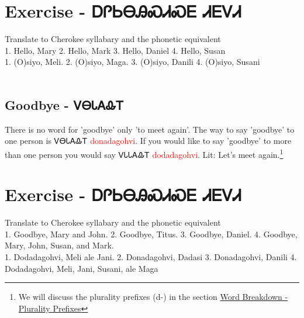 \begin{multicols}
\section{Exercise - ᎠᎵᏏᎾᎯᏍᏗᏍᎬ ᏗᎬᏙᏗ}
Translate to Cherokee syllabary and the phonetic equivalent\\
1. Hello, Mary 2. Hello, Mark 3. Hello, Daniel 4. Hello, Susan\\
1. (O)siyo, Meli. 2. (O)siyo, Maga. 3. (O)siyo, Danili 4. (O)siyo, Susani\\
\
\subsection{Goodbye - ᏙᎾᏓᎪᎲᎢ}
There is no word for 'goodbye' only 'to meet again'. The way to say 'goodbye' to one person is ᏙᎾᏓᎪᎲᎢ \textcolor{red}{donadagohvi}. If you would like to say 'goodbye' to more than one person you would say ᏙᏓᏓᎪᎲᎢ \textcolor{red}{dodadagohvi}.  Lit: Let's meet again.\footnote{We will discuss the plurality prefixes (d-) in the section \hyperref[sec:wordBreakdownPluralityPrefixes]{Word Breakdown - Plurality Prefixes}}
\section{Exercise - ᎠᎵᏏᎾᎯᏍᏗᏍᎬ ᏗᎬᏙᏗ}
Translate to Cherokee syllabary and the phonetic equivalent\\
1. Goodbye, Mary and John. 2. Goodbye, Titus. 3. Goodbye, Daniel. 4. Goodbye, Mary, John, Susan, and Mark.\\
1. Dodadagohvi, Meli ale Jani. 2. Donadagohvi, Dadasi 3. Donadagohvi, Danili 4. Dodadagohvi, Meli, Jani, Susani, ale Maga\\


\end{multicols}
